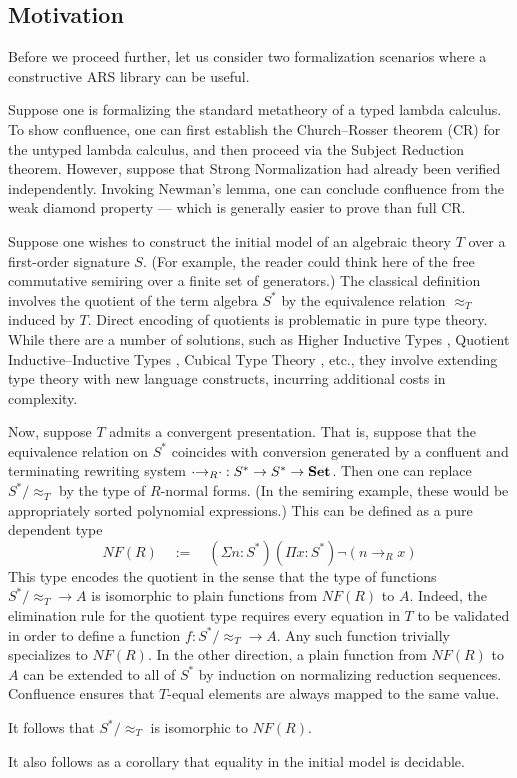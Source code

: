\subsection{Motivation}

Before we proceed further, let us consider two formalization scenarios where
a constructive ARS library can be useful.

\begin{example}
Suppose one is formalizing the standard metatheory of
a typed lambda calculus.  To show confluence, one can
first establish the Church--Rosser theorem (CR) for the untyped lambda calculus,
and then proceed via the Subject Reduction theorem.
However, suppose that Strong Normalization had already been verified independently.
Invoking Newman's lemma, one can conclude confluence from the weak
diamond property --- which is generally easier to prove than full CR.
\end{example}

\begin{example}
Suppose one wishes to construct the initial model of an algebraic theory $T$
over a first-order signature $S$.
(For example, the reader could think here of the free commutative semiring over a finite set of generators.)
The classical definition involves the quotient of the term algebra $S^*$ by
the equivalence relation $\approx_T$ induced by $T$.
Direct encoding of quotients is problematic in pure type theory.
While there are a number of solutions, such as Higher Inductive Types \cite{HoTT},
Quotient Inductive--Inductive Types \cite{QIIT}, Cubical Type Theory \cite{CTT}, etc.,
they involve extending type theory with new language constructs,
incurring additional costs in complexity.

Now, suppose $T$ admits a convergent presentation.
That is, suppose that the equivalence relation on $S^*$ coincides
with conversion generated by a confluent and terminating rewriting system
${\cdot}{\to_R}{\cdot} : S^* \to S^* \to \mathbf{Set}$.
Then one can replace $S^*/{\approx_T}$ by the type of $R$-normal forms.
(In the semiring example, these would be appropriately sorted polynomial expressions.)
This can be defined as a pure dependent type
\[ NF(R) \quad := \quad (\Sigma n : S^*) (\Pi x : S^*) \lnot (n \to_R x) \]
This type encodes the quotient in the sense that the type of functions $S^*/{\approx_T} \to A$ is isomorphic to plain functions from $NF(R)$ to $A$.
Indeed, the elimination rule for the quotient type requires every equation in $T$
to be validated in order to define a function $f : S^*/{\approx_T} \to A$.
Any such function trivially specializes to $NF(R)$.  In the other direction,
a plain function from $NF(R)$ to $A$
can be extended to all of $S^*$ by induction on normalizing reduction sequences.
Confluence ensures that $T$-equal elements are always mapped to the same value.

It follows that $S^*/{\approx_T}$ is isomorphic to $NF(R)$.

It also follows as a corollary that equality in the initial model is decidable.
\end{example}

